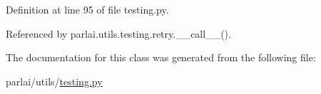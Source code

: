Definition at line 95 of file testing.\+py.



Referenced by parlai.\+utils.\+testing.\+retry.\+\_\+\+\_\+call\+\_\+\+\_\+().



The documentation for this class was generated from the following file\+:\begin{DoxyCompactItemize}
\item 
parlai/utils/\hyperlink{testing_8py}{testing.\+py}\end{DoxyCompactItemize}
